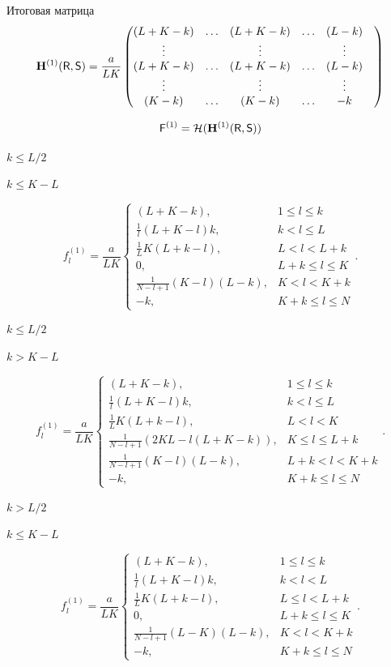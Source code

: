 \documentclass[specialist,
               substylefile = spbu.rtx,
               subf,href,colorlinks=true, 12pt]{disser}
\begin{document}
Итоговая матрица
$$\mathbf{H}^{(1)}(\textsf{R}, \textsf{S}) = \frac{a}{LK}\begin{pmatrix}
	(L + K - k) & \ldots & (L + K - k) & \ldots & (L - k)\\
	\vdots & & \vdots & & \vdots \\
	(L + K - k) & \ldots & (L + K - k) & \ldots & (L - k) & \\
	\vdots & & \vdots & & \vdots \\
	(K - k) & \ldots & (K - k) & \ldots & -k \\
\end{pmatrix}$$

$$\textsf{F}^{(1)} = \mathcal{H}(\mathbf{H}^{(1)}(\textsf{R}, \textsf{S}))$$

$k \leq L/2$

$k \leq K - L$

$$f^{(1)}_l = \frac{a}{{LK}}
\begin{cases}
	(L + K - k), & \text{$1 \leq l \leq k$}\\
	\frac{1}{l}(L + K - l)k, & \text{$k < l \leq L$}\\
	\frac{1}{L}K(L + k - l), &\text{$L < l < L + k$}\\
	0, &\text{$L + k \leq l \leq K$}\\
	\frac{1}{N - l + 1}(K - l)(L - k), &\text{$K < l < K + k$}\\
	-k, &\text{$K + k \leq l \leq N $}
\end{cases}.
$$

$k \leq L/2$

$k > K - L$

$$f^{(1)}_l = \frac{a}{{LK}}
\begin{cases}
	(L + K - k), & \text{$1 \leq l \leq k$}\\
	\frac{1}{l}(L + K - l)k, & \text{$k < l \leq L$}\\
	\frac{1}{L}K(L + k- l), &\text{$L < l < K$}\\
	\frac{1}{N - l + 1}(2KL - l(L + K - k)), &\text{$K \leq l \leq L + k$}\\
	\frac{1}{N - l + 1}( K - l)(L - k), &\text{$L + k < l < K + k$}\\
	-k, &\text{$K + k \leq l \leq N$}
\end{cases}.
$$

$k > L/2$

$k \leq K - L$

$$f^{(1)}_l = \frac{a}{{LK}}
\begin{cases}
	(L + K - k), & \text{$1 \leq l \leq k$}\\
	\frac{1}{l}(L + K - l)k, & \text{$k < l < L$}\\
	\frac{1}{L}K(L + k - l), &\text{$L \leq l < L + k$}\\
	0, &\text{$L + k \leq l \leq K$}\\
	\frac{1}{N - l + 1}(L - K)(L - k), &\text{$K < l < K + k$}\\
	-k, &\text{$K + k \leq l \leq N$}
\end{cases}.
$$
\end{document}
